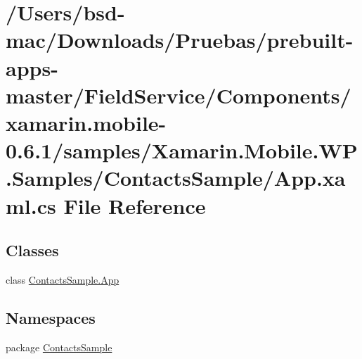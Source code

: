 \hypertarget{_components_2xamarin_8mobile-0_86_81_2samples_2_xamarin_8_mobile_8_w_p_8_samples_2_contacts_sample_2_app_8xaml_8cs}{\section{/\+Users/bsd-\/mac/\+Downloads/\+Pruebas/prebuilt-\/apps-\/master/\+Field\+Service/\+Components/xamarin.mobile-\/0.6.1/samples/\+Xamarin.Mobile.\+W\+P.\+Samples/\+Contacts\+Sample/\+App.xaml.\+cs File Reference}
\label{_components_2xamarin_8mobile-0_86_81_2samples_2_xamarin_8_mobile_8_w_p_8_samples_2_contacts_sample_2_app_8xaml_8cs}
}
\subsection*{Classes}
\begin{DoxyCompactItemize}
\item 
class \hyperlink{class_contacts_sample_1_1_app}{Contacts\+Sample.\+App}
\end{DoxyCompactItemize}
\subsection*{Namespaces}
\begin{DoxyCompactItemize}
\item 
package \hyperlink{namespace_contacts_sample}{Contacts\+Sample}
\end{DoxyCompactItemize}
